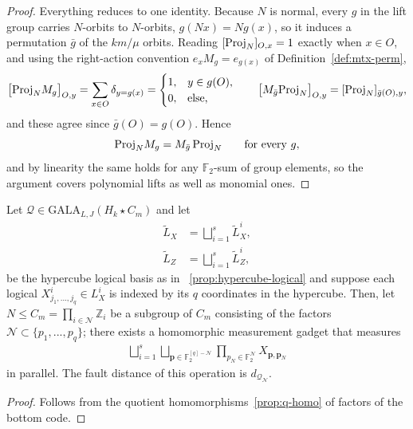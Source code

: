 \begin{proof}
Everything reduces to one identity. Because $N$ is normal, every $g$ in the lift group carries $N$-orbits to $N$-orbits, $g(Nx) = N g(x)$, so it induces a permutation $\bar g$ of the $km/\mu$ orbits. Reading $[\mathrm{Proj}_N]_{O,x} = 1$ exactly when $x\in O$, and using the right-action convention $e_xM_g = e_{g(x)}$ of Definition~\ref{def:mtx-perm},
\[
    \big[\mathrm{Proj}_N M_g\big]_{O,y} = \sum_{x\in O}\delta_{y = g(x)}
    = \begin{cases}1, & y\in g(O),\\ 0,&\text{else,}\end{cases}
    \qquad
    \big[M_{\bar g}\mathrm{Proj}_N\big]_{O,y} = [\mathrm{Proj}_N]_{\bar g(O),y},
\]
and these agree since $\bar g(O) = g(O)$. Hence
\begin{equation}\label{eq:orbit-intertwine}
    \mathrm{Proj}_N M_g = M_{\bar g}\,\mathrm{Proj}_N \qquad\text{for every } g,
\end{equation}
and by linearity the same holds for any $\mathbb F_2$-sum of group elements, so the argument covers polynomial lifts as well as monomial ones.
\end{proof}
\begin{proposition}[tCNOTs]

Let $\mathcal{Q}\in \mathrm{GALA}_{L,J}(H_k\star C_m)$ and let \begin{align*}
            \tilde L_X &= \bigsqcup_{i = 1}^s \tilde L_X^i, \\
        \tilde L_Z &= \bigsqcup_{i = 1}^s \tilde L_Z^i,
\end{align*}
be the hypercube logical basis as in ~\ref{prop:hypercube-logical} and suppose each logical $X^i_{j_1,...,j_q}\in  L^i_X$ is indexed by its $q$ coordinates in the hypercube. Then,  let $N \leq C_m = \prod_{i\in \mathcal{N}}\mathbb Z_{i}$ be a subgroup of $C_m$ consisting of the factors $\mathcal{N}\subset \{p_1,...,p_q\}$; there exists a homomorphic measurement gadget that measures 
\begin{align*}
    \bigsqcup_{i = 1}^s \bigsqcup_{\textbf{p}\in \mathbb F_2^{[q]-\mathcal{N}}}\prod_{p_N\in \mathbb F_2^{\mathcal{N}}} X_{\textbf{p}, \textbf{p}_N}
\end{align*}
in parallel. The fault distance of this operation is $d_{\mathcal{Q_N}}$.
\end{proposition}
\begin{proof}
    Follows from the quotient homomorphisms~\ref{prop:q-homo} of factors of the bottom code.
\end{proof}